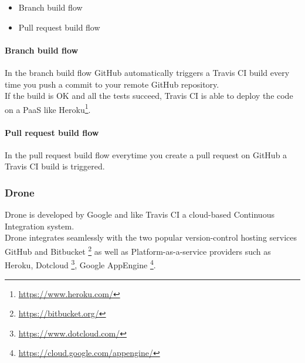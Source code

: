 \begin{itemize}
    \item Branch build flow
    \item Pull request build flow
\end{itemize}

\paragraph{Branch build flow} In the branch build flow GitHub automatically
triggers a Travis CI build every time you push a commit to your remote GitHub
repository.\\ If the build is OK and all the tests succeed, Travis CI is able to
deploy the code on a PaaS like Heroku\footnote{\url{https://www.heroku.com/}}.

\paragraph{Pull request build flow} In the pull request build flow everytime you
create a pull request on GitHub a Travis CI build is triggered.

\subsubsection{Drone}

Drone is developed by Google and like Travis CI a cloud-based Continuous
Integration system.\\

Drone integrates seamlessly with the two popular
version-control hosting services GitHub and Bitbucket
\footnote{\url{https://bitbucket.org/}} as well as Platform-as-a-service
providers such as Heroku, Dotcloud \footnote{\url{https://www.dotcloud.com/}},
Google AppEngine  \footnote{\url{https://cloud.google.com/appengine/}}.

